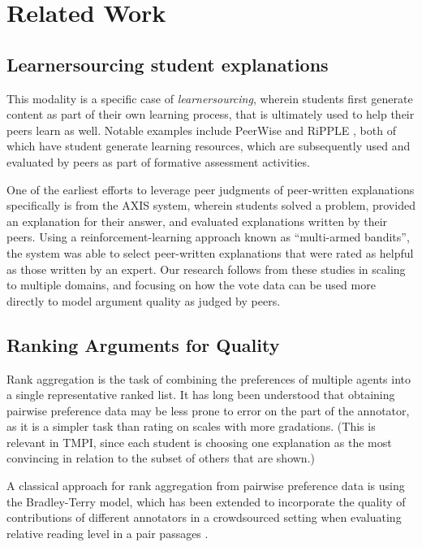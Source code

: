 \documentclass[notitlepage,12pt]{jedm}
\begin{document}
\section{Related Work}\label{sec:related_work}

\subsection{Learnersourcing student explanations}
This modality is a specific case of  
\textit{learnersourcing}\cite{weir_learnersourcing_2015}, wherein students first
generate content as part of their own learning process, that is ultimately used 
to help their peers learn as well.
Notable examples include PeerWise \cite{denny_peerwise:_2008} and RiPPLE 
\cite{khosravi_ripple_2019}, both of which have student generate learning 
resources, which are subsequently used and evaluated by peers as part of 
formative assessment activities.

One of the earliest efforts to leverage peer judgments of peer-written 
explanations specifically is from the AXIS system\cite{williams_axis:_2016}, 
wherein students solved a problem, provided an explanation for their answer, 
and evaluated explanations written by their peers.
Using a reinforcement-learning approach known as ``multi-armed bandits'', the 
system was able to select peer-written explanations that were rated as helpful 
as those written by an expert.
Our research follows from these studies in scaling to multiple domains, and 
focusing on how the vote data can be used more directly to model argument 
quality as judged by peers.

\subsection{Ranking Arguments for Quality}
Rank aggregation is the task of combining the preferences of multiple agents 
into a single representative ranked list.
It has long been understood that obtaining pairwise preference data may be 
less prone to error on the part of the annotator, as it is a simpler task than 
rating on scales with more gradations. 
(This is relevant in TMPI, since each student is choosing one explanation as 
the most convincing in relation to the subset of others that are shown.)

A classical approach for rank aggregation from pairwise preference data is 
using the Bradley-Terry model, which has been extended to incorporate the 
quality of contributions of different annotators in a crowdsourced setting when 
evaluating relative reading level in a pair passages \cite{chen_pairwise_2013}. 
\end{document}

